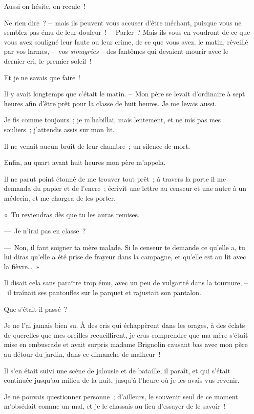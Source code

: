 \documentclass[french,twoside]{book} %
\begin{document}
Aussi on hésite, on recule !\par
Ne rien dire ? – mais ils peuvent vous accuser d’être méchant, puisque vous ne semblez pas ému de leur douleur ! – Parler ? Mais ils vous en voudront de ce que vous avez souligné leur faute ou leur crime, de ce que vous avez, le matin, réveillé par vos larmes, – vos \emph{simagrées} – des fantômes qui devaient mourir avec le dernier cri, le premier soleil !\par
Et je ne savais que faire !\par
\bigbreak
\noindent Il y avait longtemps que c’était le matin. – Mon père se levait d’ordinaire à sept heures afin d’être prêt pour la classe de huit heures. Je me levais aussi.\par
Je fis comme toujours ; je m’habillai, mais lentement, et ne mis pas mes souliers ; j’attendis assis sur mon lit.\par
Il ne venait aucun bruit de leur chambre ; un silence de mort.\par
Enfin, au quart avant huit heures mon père m’appela.\par
Il ne parut point étonné de me trouver tout prêt ; à travers la porte il me demanda du papier et de l’encre ; écrivit une lettre au censeur et une autre à un médecin, et me chargea de les porter.\par
« Tu reviendras dès que tu les auras remises.\par
— Je n’irai pas en classe ?\par
— Non, il faut soigner ta mère malade. Si le censeur te demande ce qu’elle a, tu lui diras qu’elle a été prise de frayeur dans la campagne, et qu’elle est au lit avec la fièvre… »\par
Il disait cela sans paraître trop ému, avec un peu de vulgarité dans la tournure, – il traînait ses pantoufles sur le parquet et rajustait son pantalon.\par
Que s’était-il passé ?\par
Je ne l’ai jamais bien su. À des cris qui échappèrent dans les orages, à des éclats de querelles que mes oreilles recueillirent, je crus comprendre que ma mère s’était mise en embuscade et avait surpris madame Brignolin causant bas avec mon père au détour du jardin, dans ce dimanche de malheur !\par
Il s’en était suivi une scène de jalousie et de bataille, il paraît, et qui s’était continuée jusqu’au milieu de la nuit, jusqu’à l’heure où je les avais vus revenir.\par
Je ne pouvais questionner personne ; d’ailleurs, le souvenir seul de ce moment m’obsédait comme un mal, et je le chassais au lieu d’essayer de le savoir !\par
\end{document}

